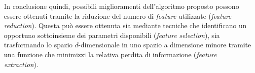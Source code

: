In conclusione quindi, possibili miglioramenti dell'algoritmo proposto possono essere ottenuti tramite la riduzione del numero di \emph{feature} utilizzate (\emph{feature reduction}). Questa può  essere ottenuta sia mediante tecniche che identificano un opportuno sottoinsieme dei parametri disponibili (\emph{feature selection}), sia trasformando lo spazio $d$-dimensionale  in uno spazio a dimensione minore tramite una funzione che minimizzi la relativa perdita di informazione (\emph{feature extraction}).
